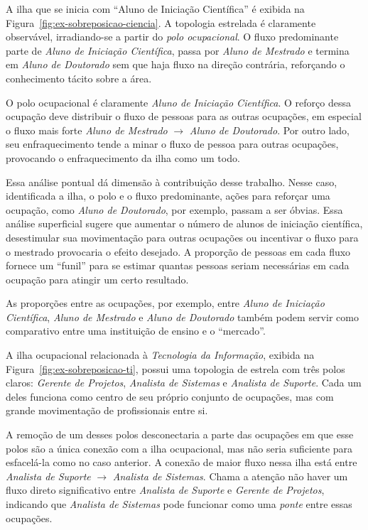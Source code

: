 \documentclass[
  article,
  11pt,
  a4paper,
  english,
  brazil,
  sumario=tradicional]{abntex2}
\begin{document}
A ilha que se inicia com \enquote{Aluno de Iniciação Científica} é exibida na Figura~\ref{fig:ex-sobreposicao-ciencia}. A topologia estrelada é claramente observável, irradiando-se a partir do \textit{polo ocupacional}. O fluxo predominante parte de \textit{Aluno de Iniciação Científica}, passa por \textit{Aluno de Mestrado} e termina em \textit{Aluno de Doutorado} sem que haja fluxo na direção contrária, reforçando o conhecimento tácito sobre a área.

O polo ocupacional é claramente \textit{Aluno de Iniciação Científica}. O reforço dessa ocupação deve distribuir o fluxo de pessoas para as outras ocupações, em especial o fluxo mais forte \textit{Aluno de Mestrado} $\rightarrow$ \textit{Aluno de Doutorado}. Por outro lado, seu enfraquecimento tende a minar o fluxo de pessoa para outras ocupações, provocando o enfraquecimento da ilha como um todo.

Essa análise pontual dá dimensão à contribuição desse trabalho. Nesse caso, identificada a ilha, o polo e o fluxo predominante,  ações para reforçar uma ocupação, como \textit{Aluno de Doutorado}, por exemplo, passam a ser óbvias. Essa análise superficial sugere que aumentar o número de alunos de iniciação científica, desestimular sua movimentação para outras ocupações ou incentivar o fluxo para o mestrado provocaria o efeito desejado. A proporção de pessoas em cada fluxo fornece um \enquote{funil} para se estimar quantas pessoas seriam necessárias em cada ocupação para atingir um certo resultado.

As proporções entre as ocupações, por exemplo, entre \textit{Aluno de Iniciação Científica}, \textit{Aluno de Mestrado} e \textit{Aluno de Doutorado} também podem servir como comparativo entre uma instituição de ensino e o \enquote{mercado}.

A ilha ocupacional relacionada à \textit{Tecnologia da Informação}, exibida na Figura~\ref{fig:ex-sobreposicao-ti}, possui uma topologia de estrela com três polos claros: \textit{Gerente de Projetos}, \textit{Analista de Sistemas} e \textit{Analista de Suporte}. Cada um deles funciona como centro de seu próprio conjunto de ocupações, mas com grande movimentação de profissionais entre si.

A remoção de um desses polos desconectaria a parte das ocupações em que esse polos são a única conexão com a ilha ocupacional, mas não seria suficiente para esfacelá-la como no caso anterior. A conexão de maior fluxo nessa ilha está entre \textit{Analista de Suporte} $\rightarrow$ \textit{Analista de Sistemas}. Chama a atenção não haver um fluxo direto significativo entre \textit{Analista de Suporte} e \textit{Gerente de Projetos}, indicando que \textit{Analista de Sistemas} pode funcionar como uma \textit{ponte} entre essas ocupações.
\end{document}
